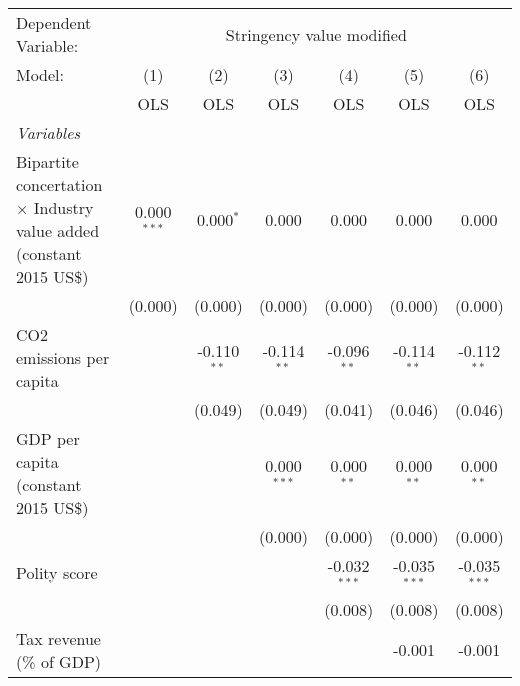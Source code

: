 
\begingroup
\centering
\begin{tabular}{lcccccc}
   \toprule
   Dependent Variable: & \multicolumn{6}{c}{Stringency value modified}\\
   Model:                                                                      & (1)           & (2)           & (3)           & (4)            & (5)            & (6)\\  
                                                                               &  OLS          & OLS           & OLS           & OLS            & OLS            & OLS\\  
   \midrule
   \emph{Variables}\\
   Bipartite concertation $\times$ Industry value added (constant 2015 US\$)   & 0.000$^{***}$ & 0.000$^{*}$   & 0.000         & 0.000          & 0.000          & 0.000\\   
                                                                               & (0.000)       & (0.000)       & (0.000)       & (0.000)        & (0.000)        & (0.000)\\   
   CO2 emissions per capita                                                    &               & -0.110$^{**}$ & -0.114$^{**}$ & -0.096$^{**}$  & -0.114$^{**}$  & -0.112$^{**}$\\   
                                                                               &               & (0.049)       & (0.049)       & (0.041)        & (0.046)        & (0.046)\\   
   GDP per capita (constant 2015 US\$)                                         &               &               & 0.000$^{***}$ & 0.000$^{**}$   & 0.000$^{**}$   & 0.000$^{**}$\\   
                                                                               &               &               & (0.000)       & (0.000)        & (0.000)        & (0.000)\\   
   Polity score                                                                &               &               &               & -0.032$^{***}$ & -0.035$^{***}$ & -0.035$^{***}$\\   
                                                                               &               &               &               & (0.008)        & (0.008)        & (0.008)\\   
   Tax revenue (\% of GDP)                                                     &               &               &               &                & -0.001         & -0.001\\   

\end{tabular}

